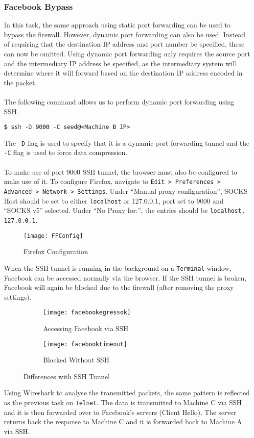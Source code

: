 \documentclass[a4paper,12pt]{article}
\begin{document}
\subsubsection{Facebook Bypass}
In this task, the same approach using static port forwarding can be used to bypass the firewall. However, dynamic port forwarding can also be used. Instead of requiring that the destination IP address and port number be specified, these can now be omitted. Using dynamic port forwarding only requires the source port and the intermediary IP address be specified, as the intermediary system will determine where it will forward based on the destination IP address encoded in the packet.\\\\The following command allows us to perform dynamic port forwarding using SSH.
\begin{verbatim}
$ ssh -D 9000 -C seed@<Machine B IP>
\end{verbatim}
The \texttt{-D} flag is used to specify that it is a dynamic port forwarding tunnel and the \texttt{-C} flag is used to force data compression.\\\\To make use of port 9000 SSH tunnel, the browser must also be configured to make use of it. To configure Firefox, navigate to \texttt{Edit > Preferences > Advanced > Network > Settings}. Under ``Manual proxy configuration'', SOCKS Host should be set to either \texttt{localhost} or 127.0.0.1, port set to 9000 and ``SOCKS v5'' selected. Under ``No Proxy for:'', the entries should be \texttt{localhost, 127.0.0.1}.
\begin{figure}[H]
\centering
\texttt{[image: FFConfig]}
\caption{Firefox Configuration}
\label{fig:ffconfig}
\end{figure}

\noindent When the SSH tunnel is running in the background on a \texttt{Terminal} window, Facebook can be accessed normally via the browser. If the SSH tunnel is broken, Facebook will again be blocked due to the firewall (after removing the proxy settings).

\begin{figure}[H]
	\centering
		\begin{subfigure}[H]{0.8\textwidth}
			\centering
			\texttt{[image: facebookegressok]}
			\caption{Accessing Facebook via SSH}
			\label{fig:FacebookSSH}
		\end{subfigure}
		\begin{subfigure}{0.8\textwidth}
			\centering
			\texttt{[image: facebooktimeout]}
			\caption{Blocked Without SSH}
			\label{fig:FacebookBlock}
		\end{subfigure}
		\caption{Differences with SSH Tunnel}
	\end{figure}
\noindent Using Wireshark to analyse the transmitted packets, the same pattern is reflected as the previous task on \texttt{Telnet}. The data is transmitted to Machine C via SSH and it is then forwarded over to Facebook's servers (Client Hello). The server returns back the response to Machine C and it is forwarded back to Machine A via SSH.
\end{document}
